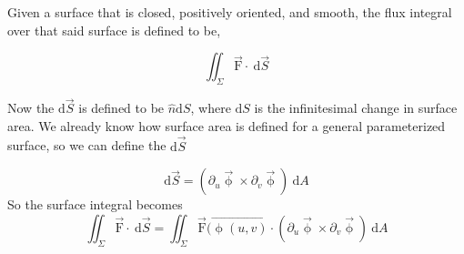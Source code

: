 {
	Given a surface that is closed, positively oriented, and smooth, the flux integral over that said surface is defined to be, 

	\begin{equation*}
		\iint_\Sigma \vec{\mathrm{F}} \cdot \: \mathrm{d}\vec{S}
	\end{equation*}

	Now the $\mathrm{d}\vec{S}$ is defined to be $\hat{n}\mathrm{d}S$, where $\mathrm{d}S$ is the infinitesimal change in surface area. We already know how surface area is defined for a general parameterized surface, so we can define the $\mathrm{d}\vec{S}$

	\begin{equation*}
		\mathrm{d}\vec{S} = (\partial_u\vec\upphi \times \partial_v\vec\upphi)\:\mathrm{d}A	
	\end{equation*}
	So the surface integral becomes 
	\begin{equation*}
		\iint_\Sigma \vec{\mathrm{F}} \cdot \: \mathrm{d}\vec{S} = \iint_\Sigma \vec{\mathrm{F}}(\vec{\upphi(u,v)} \cdot (\partial_u\vec\upphi \times \partial_v\vec\upphi) \:\mathrm{d}A
	\end{equation*}
}
